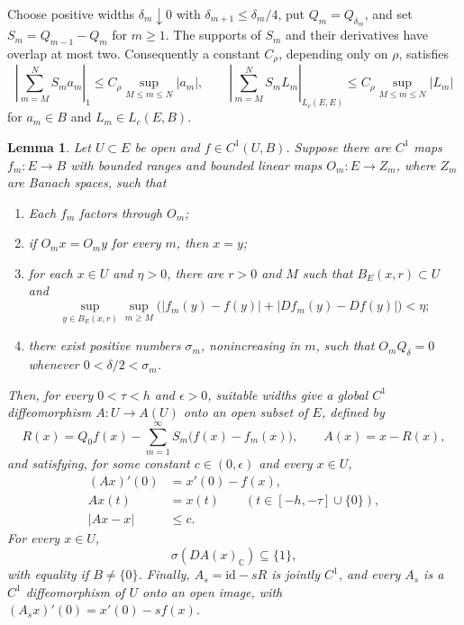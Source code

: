 \documentclass[11pt]{article}
\newtheorem{lemma}[theorem]{Lemma}
\newcommand{\Lc}{L_c}
\newcommand{\id}{\mathrm{id}}
\begin{document}
Choose positive widths $\delta_m\downarrow0$ with
$\delta_{m+1}\le\delta_m/4$, put
$Q_m=Q_{\delta_m}$, and set
$S_m=Q_{m-1}-Q_m$ for $m\ge1$.
The supports of $S_m$ and their derivatives have
overlap at most two. Consequently a constant
$C_\rho$, depending only on $\rho$, satisfies
\begin{equation}\label{eq:overlap}
 \left|\sum_{m=M}^{N}S_m a_m\right|_1
 \le C_\rho\sup_{M\le m\le N}|a_m|,
 \qquad
 \left|\sum_{m=M}^{N}S_m L_m\right|_{\Lc(E,E)}
 \le C_\rho\sup_{M\le m\le N}|L_m|
\end{equation}
for $a_m\in B$ and $L_m\in\Lc(E,B)$.

\begin{lemma}\label{lem:triangular}
Let $U\subset E$ be open and $f\in C^1(U,B)$.
Suppose there are $C^1$ maps $f_m:E\to B$
with bounded ranges and bounded linear maps
$O_m:E\to Z_m$, where $Z_m$ are Banach spaces,
such that
\begin{enumerate}
\item Each $f_m$ factors through $O_m$;
\item if $O_mx=O_my$ for every $m$, then $x=y$;
\item for each $x\in U$ and $\eta>0$, there
are $r>0$ and $M$ such that
$B_E(x,r)\subset U$ and
\begin{equation}\label{eq:localC1}
 \sup_{y\in B_E(x,r)}\sup_{m\ge M}
 \bigl(|f_m(y)-f(y)|
 +|Df_m(y)-Df(y)|\bigr)<\eta;
\end{equation}
\item there exist positive numbers $\sigma_m$,
nonincreasing in $m$, such that
$O_mQ_\delta=0$ whenever
$0<\delta/2<\sigma_m$.
\end{enumerate}
Then, for every $0<\tau<h$ and $\epsilon>0$,
suitable widths give a global $C^1$ diffeomorphism
$A:U\to A(U)$ onto an open subset of $E$, defined by
\begin{equation}\label{eq:coordinate}
 R(x)=Q_0f(x)-\sum_{m=1}^{\infty}S_m
 \bigl(f(x)-f_m(x)\bigr),
 \qquad A(x)=x-R(x),
\end{equation}
and satisfying, for some constant $c\in(0,\epsilon)$
and every $x\in U$,
\begin{align*}
 (Ax)'(0)&=x'(0)-f(x),\\
 Ax(t)&=x(t)
 \qquad(t\in[-h,-\tau]\cup\{0\}),\\
 |Ax-x|&\le c.
\end{align*}
For every $x\in U$,
\begin{equation}\label{eq:spectral-inclusion}
 \sigma(DA(x)_{\mathbb C})\subseteq\{1\},
\end{equation}
with equality if $B\ne\{0\}$. Finally,
$A_s=\id-sR$ is jointly $C^1$, and every
$A_s$ is a $C^1$ diffeomorphism of $U$
onto an open image, with
$(A_sx)'(0)=x'(0)-sf(x)$.
\end{lemma}
\end{document}
